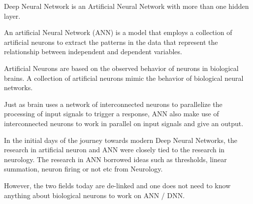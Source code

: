 	\begin{bulletedlist}
		\item Deep Neural Network is an Artificial Neural Network with more than one hidden layer.
		\item An artificial Neural Network (ANN) is a model that employs a collection of artificial neurons to extract the patterns in the data that represent the relationship between independent and dependent variables.
		\item Artificial Neurons are based on the observed behavior of neurons in biological brains. A collection of artificial neurons mimic the behavior of biological neural networks.
		\item Just as brain uses a network of interconnected neurons to parallelize the processing of input signals to trigger a response, ANN also make use of interconnected neurons to work in parallel on input signals and give an output.
		\item In the initial days of the journey towards modern Deep Neural Networks, the research in artificial neuron and ANN were closely tied to the research in
neurology. The research in ANN borrowed ideas such as thresholds, linear summation, neuron firing or not etc from Neurology.
		\item However, the two fields today are de-linked and one does not need to know anything about biological neurons to work on ANN / DNN.
	\end{bulletedlist}
